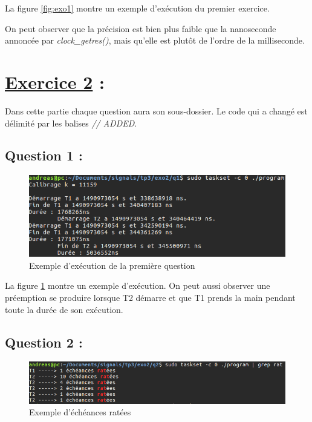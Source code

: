 \documentclass{article}
\begin{document}
La figure \ref{fig:exo1} montre un exemple d'exécution du premier exercice.

On peut observer que la précision est bien plus faible que la nanoseconde annoncée par \textit{clock\_getres()}, mais qu'elle est plutôt de l'ordre de la milliseconde.

\section*{\underline{Exercice 2} :}

Dans cette partie chaque question aura son sous-dossier. Le code qui a changé est délimité par les balises \textit{// ADDED}.
\subsection*{Question 1 :}

\begin{figure}
  \includegraphics[width=\linewidth]{2-1.png}
  \caption{Exemple d'exécution de la première question}
  \label{fig:2.1}
\end{figure}

La figure \ref{fig:2.1} montre un exemple d'exécution. On peut aussi observer une préemption se produire lorsque T2 démarre et que T1 prends la main pendant toute la durée de son exécution.

\subsection*{Question 2 :}

\begin{figure}
  \includegraphics[width=\linewidth]{2-2.png}
  \caption{Exemple d'échéances ratées}
  \label{fig:2.2}
\end{figure}
\end{document}
